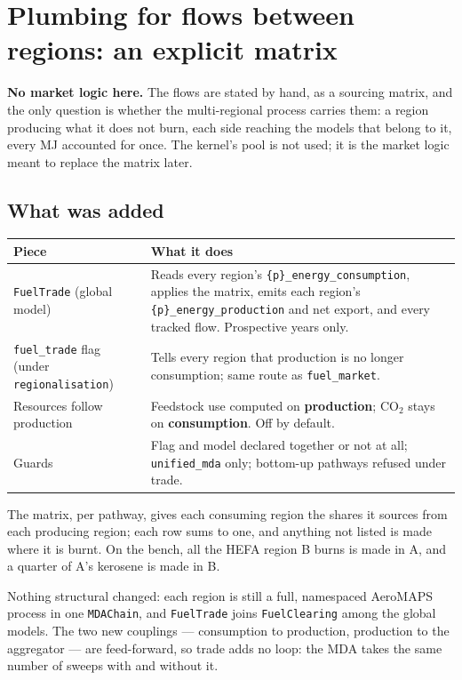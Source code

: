 \documentclass[11pt,a4paper]{article}
\newcommand{\var}[1]{\texttt{\small #1}}
\begin{document}
\section{Plumbing for flows between regions: an explicit matrix}
\label{sec:trade}

\textbf{No market logic here.} The flows are stated by hand, as a sourcing matrix, and the only
question is whether the multi-regional process carries them: a region producing what it does
not burn, each side reaching the models that belong to it, every MJ accounted for once. The
kernel's pool is not used; it is the market logic meant to replace the matrix later.

\subsection{What was added}

\begin{center}\small
\begin{tabular}{@{}p{4.2cm}p{11.0cm}@{}}
\toprule
\textbf{Piece} & \textbf{What it does} \\
\midrule
\var{FuelTrade} (global model) & Reads every region's \var{\{p\}\_energy\_consumption}, applies the matrix, emits each region's \var{\{p\}\_energy\_production} and net export, and every tracked flow. Prospective years only. \\
\var{fuel\_trade} flag (under \var{regionalisation}) & Tells every region that production is no longer consumption; same route as \var{fuel\_market}. \\
Resources follow production & Feedstock use computed on \textbf{production}; CO$_2$ stays on \textbf{consumption}. Off by default. \\
Guards & Flag and model declared together or not at all; \var{unified\_mda} only; bottom-up pathways refused under trade. \\
\bottomrule
\end{tabular}
\end{center}

\noindent The matrix, per pathway, gives each consuming region the shares it sources from each
producing region; each row sums to one, and anything not listed is made where it is burnt. On the
bench, all the HEFA region B burns is made in A, and a quarter of A's kerosene is made in B.

Nothing structural changed: each region is still a full, namespaced AeroMAPS process in one
\var{MDAChain}, and \var{FuelTrade} joins \var{FuelClearing} among the global models. The two new
couplings --- consumption to production, production to the aggregator --- are feed-forward, so
trade adds no loop: the MDA takes the same number of sweeps with and without it.
\end{document}
